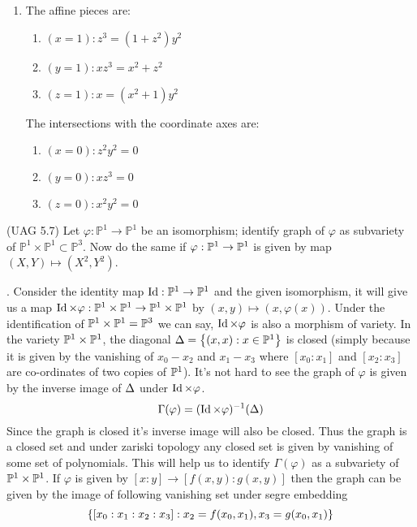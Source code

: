 \documentclass[12pt]{article}
\begin{document}
\begin{enumerate}[label = (\alph*)]
    \item The affine pieces are:
          \begin{enumerate}[label = (\roman*)]
              \item \( (x=1): z^3=(1+z^2)y^2 \)
              \item \( (y=1): xz^3=x^2+z^2 \)
              \item \( (z=1): x=(x^2+1)y^2 \)
          \end{enumerate}
          The intersections with the coordinate axes are:
          \begin{enumerate}[label = (\roman*)]
              \item \( (x=0): z^2y^2=0 \)
              \item \( (y=0): xz^3=0 \)
              \item \( (z=0): x^2y^2=0 \)
          \end{enumerate}
\end{enumerate}

\begin{prob} %
    (UAG 5.7) Let $\varphi : \mathbb{P}^1 \to \mathbb{P}^1$ be an isomorphism; identify graph of $\varphi$ as subvariety of $\mathbb{P}^1 \times \mathbb{P}^1\subset \mathbb{P}^3$. Now do the same if $\varphi : \mathbb{P}^1 \to \mathbb{P}^1$ is given by map $(X,Y)\mapsto (X^2,Y^2)$.
\end{prob}

\sol. Consider the identity map $\operatorname{Id} : \mathbb{P}^1 \to \mathbb{P}^1$ and the given isomorphism, it will give us a map $\operatorname{Id} \times \varphi :\mathbb{P}^1 \times \mathbb{P}^1 \to \mathbb{P}^1\times \mathbb{P}^1$ by $(x,y)\mapsto (x,\varphi(x))$. Under the identification of $\mathbb{P}^1 \times \mathbb{P}^1 = \mathbb{P}^3$ we can say, $\operatorname{Id} \times \varphi$ is also a morphism of variety. In the variety $\mathbb{P}^1 \times \mathbb{P}^1$, the diagonal $\Delta = \qty{(x,x): x \in \mathbb{P}^1}$ is closed (simply because it is given by the vanishing of $x_0-x_2$ and $x_1-x_3$ where $[x_0:x_1]$ and $[x_2:x_3]$ are co-ordinates of two copies of $\mathbb{P}^1$). It's not hard to see the graph of $\varphi$ is given by the inverse image of $\Delta$ under $\operatorname{Id} \times \varphi$. $$\Gamma(\varphi)= (\operatorname{Id} \times \varphi)^{- 1}(\Delta)$$ Since the graph is closed it's inverse image will also be closed. Thus the graph is a closed set and under zariski topology any closed set is given by vanishing of some set of polynomials. This will help us to identify $\Gamma(\varphi)$ as a subvariety of $\mathbb{P}^1\times \mathbb{P}^1$. If $\varphi$ is given by $[x:y]\to [f(x,y):g(x,y)]$ then the graph can be given by the image of following vanishing set under segre embedding $$\qty{[x_0:x_1:x_2:x_3]: x_2 =f(x_0,x_1), x_3=g(x_0,x_1)}$$
\end{document}
